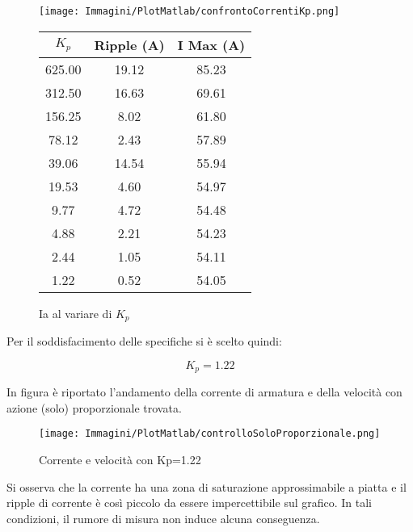 \documentclass[a4paper,12pt]{article}
\begin{document}
\begin{figure}[h!]
\centering
\begin{minipage}{0.60\textwidth}
    \centering
    \texttt{[image: Immagini/PlotMatlab/confrontoCorrentiKp.png]}
    \caption{Ia al variare di $K_p$}
    \label{fig:andamento_kp}
\end{minipage}
\hfill
\begin{minipage}{0.38\textwidth}
    \centering
    \small
    \begin{tabular}{|c|c|c|}
        \hline
        \textbf{$K_p$} & \textbf{Ripple (A)} & \textbf{I Max (A)} \\
        \hline
        625.00 & 19.12 & 85.23 \\
        312.50 & 16.63 & 69.61 \\
        156.25 & 8.02  & 61.80 \\
        78.12  & 2.43  & 57.89 \\
        39.06  & 14.54 & 55.94 \\
        19.53  & 4.60  & 54.97 \\
        9.77   & 4.72  & 54.48 \\
        4.88   & 2.21  & 54.23 \\
        2.44   & 1.05  & 54.11 \\
        1.22   & 0.52  & 54.05 \\
        \hline
    \end{tabular}
    \label{tab:iterazioni_kp}
\end{minipage}
\end{figure}


Per il soddisfacimento delle specifiche si è scelto quindi:

\[
    K_p = 1.22
\]

In figura è riportato l'andamento della corrente di armatura e della velocità con azione (solo) proporzionale trovata.

\begin{figure}[h!]
    \centering
    \texttt{[image: Immagini/PlotMatlab/controlloSoloProporzionale.png]}
    \caption{Corrente e velocità con Kp=1.22}
    \label{fig:kpscelto}
\end{figure}

\vspace{0.5cm}

Si osserva che la corrente ha una zona di saturazione approssimabile a piatta e il ripple di corrente è così piccolo da essere impercettibile sul grafico.
In tali condizioni, il rumore di misura non induce alcuna conseguenza.
\end{document}
